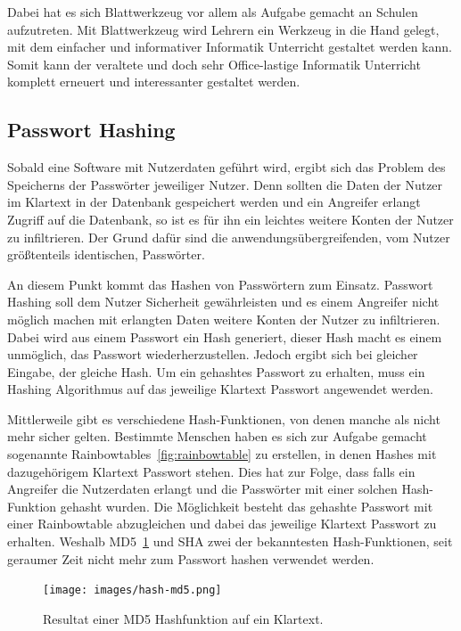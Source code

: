 \documentclass[11pt]{article}
\newcommand{\hlnote}[2]{#1}
\newcommand{\hlnote}[2]{\todo{#2}\texthl{#1}}
\begin{document}
	Dabei hat es sich Blattwerkzeug vor allem als Aufgabe gemacht an Schulen aufzutreten. Mit Blattwerkzeug wird Lehrern ein Werkzeug in die Hand gelegt, mit dem einfacher und informativer Informatik Unterricht gestaltet werden kann. Somit kann der veraltete und doch sehr Office-lastige Informatik Unterricht komplett erneuert und interessanter gestaltet werden.
	
	\subsection{Passwort Hashing}
	\label{sec:password_hashing}
	
	Sobald eine Software mit Nutzerdaten geführt wird, ergibt sich das Problem des Speicherns der Passwörter jeweiliger Nutzer.
	Denn sollten die Daten der Nutzer im Klartext in der Datenbank gespeichert werden und ein Angreifer erlangt Zugriff auf die Datenbank, so ist es für ihn ein leichtes weitere Konten der Nutzer zu infiltrieren. Der Grund dafür sind die anwendungsübergreifenden, vom Nutzer größtenteils identischen, Passwörter.
	
	An diesem Punkt kommt das Hashen von Passwörtern zum Einsatz. Passwort Hashing soll dem Nutzer Sicherheit gewährleisten und es einem Angreifer nicht möglich machen mit erlangten Daten weitere Konten der Nutzer zu infiltrieren. Dabei wird aus einem Passwort ein Hash generiert, dieser Hash macht es einem unmöglich, das Passwort wiederherzustellen. Jedoch ergibt sich bei gleicher Eingabe, der gleiche Hash. Um ein gehashtes Passwort zu erhalten, muss ein Hashing Algorithmus auf das jeweilige Klartext Passwort angewendet werden.
	
	Mittlerweile gibt es verschiedene Hash-Funktionen, von denen manche als nicht mehr sicher gelten. \hlnote{Bestimmte}{Weasel} Menschen haben es sich zur Aufgabe gemacht sogenannte Rainbowtables~\ref{fig:rainbowtable} zu erstellen, in denen Hashes mit dazugehörigem Klartext Passwort stehen. Dies hat zur Folge, dass falls ein Angreifer die Nutzerdaten erlangt und die Passwörter mit einer solchen Hash-Funktion gehasht wurden. Die Möglichkeit besteht das gehashte Passwort mit einer Rainbowtable abzugleichen und dabei das jeweilige Klartext Passwort zu erhalten. Weshalb MD5~\ref{fig:md5} und SHA zwei der bekanntesten Hash-Funktionen, seit geraumer Zeit nicht mehr zum Passwort hashen verwendet werden.
	
	\begin{figure}[h]
		\texttt{[image: images/hash-md5.png]}
		\caption{Resultat einer MD5 Hashfunktion auf ein Klartext.}
		\label{fig:md5}
	\end{figure}
\end{document}
